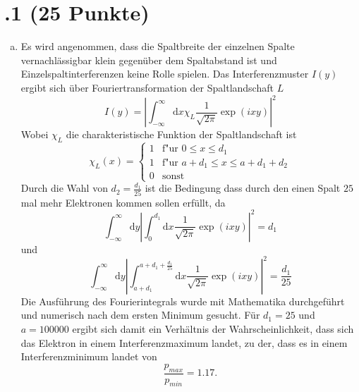 \section*{\nr.1 \titone (25 Punkte)}
\begin{enumerate}[(a)]
\item Es wird angenommen, dass die Spaltbreite der einzelnen Spalte vernachlässigbar klein gegenüber dem Spaltabstand ist und Einzelspaltinterferenzen keine Rolle spielen.
Das Interferenzmuster $I(y)$ ergibt sich über Fouriertransformation der Spaltlandschaft $L$
\begin{equation}
  I(y)=|\int_{-\infty}^{\infty} \mathrm{d}x \chi_L \frac{1}{\sqrt{2 \pi}}\exp\left(ixy\right)|^2
\end{equation}
Wobei $\chi_L$ die charakteristische Funktion der Spaltlandschaft ist 
\begin{equation}
   \chi_L(x) =
   \begin{cases}
     1 & \text{f"ur } 0 \leq x \leq d_1 \\
     1 & \text{f"ur } a + d_1 \leq x \leq a + d_1 + d_2 \\
     0  & \text{sonst}
   \end{cases}
\end{equation}
Durch die Wahl von $d_2 = \frac{d_1}{25}$ ist die Bedingung dass durch den einen Spalt $25$ mal mehr Elektronen kommen sollen erfüllt, da
\begin{equation}
  \int_{-\infty}^{\infty} \mathrm{d}y |\int_{0}^{d_1} \mathrm{d}x \frac{1}{\sqrt{2 \pi}}\exp\left(ixy\right)|^2 =d_1
\end{equation}
und 
\begin{equation}
  \int_{-\infty}^{\infty} \mathrm{d}y |\int_{a+d_1}^{a+d_1+\frac{d_1}{25}} \mathrm{d}x \frac{1}{\sqrt{2 \pi}}\exp\left(ixy\right)|^2 =\frac{d_1}{25}
\end{equation}
Die Ausführung des Fourierintegrals wurde mit Mathematika durchgeführt und numerisch nach dem ersten Minimum gesucht. Für $d_1=25$ und $a=100000$ ergibt sich damit ein Verhältnis der Wahrscheinlichkeit, dass sich das Elektron in einem Interferenzmaximum landet, zu der, dass es in einem Interferenzminimum landet von
\begin{equation}
  \frac{p_{max}}{p_{min}}=1.17.
\end{equation}
\end{enumerate}